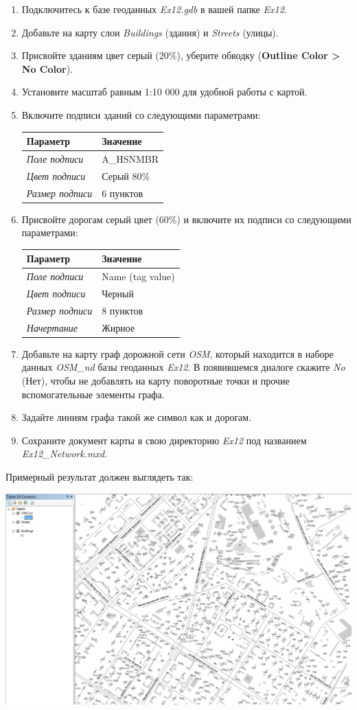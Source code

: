 \documentclass[]{book}
\theoremstyle{definition}
\theoremstyle{definition}
\theoremstyle{definition}
\theoremstyle{remark}
\begin{document}
\begin{enumerate}
\def\labelenumi{\arabic{enumi}.}
\item
  Подключитесь к базе геоданных \emph{Ex12.gdb} в вашей папке
  \emph{Ex12}.
\item
  Добавьте на карту слои \emph{Buildings} (здания) и \emph{Streets}
  (улицы).
\item
  Присвойте зданиям цвет серый (20\%), уберите обводку (\textbf{Outline
  Color \textgreater{} No Color}).
\item
  Установите масштаб равным 1:10 000 для удобной работы с картой.
\item
  Включите подписи зданий со следующими параметрами:

  \begin{longtable}[]{@{}ll@{}}
  \toprule
  Параметр & Значение\tabularnewline
  \midrule
  \endhead
  \emph{Поле подписи} & A\_HSNMBR\tabularnewline
  \emph{Цвет подписи} & Серый 80\%\tabularnewline
  \emph{Размер подписи} & 6 пунктов\tabularnewline
  \bottomrule
  \end{longtable}
\item
  Присвойте дорогам серый цвет (60\%) и включите их подписи со
  следующими параметрами:

  \begin{longtable}[]{@{}ll@{}}
  \toprule
  Параметр & Значение\tabularnewline
  \midrule
  \endhead
  \emph{Поле подписи} & Name (tag value)\tabularnewline
  \emph{Цвет подписи} & Черный\tabularnewline
  \emph{Размер подписи} & 8 пунктов\tabularnewline
  \emph{Начертание} & Жирное\tabularnewline
  \bottomrule
  \end{longtable}
\item
  Добавьте на карту граф дорожной сети \emph{OSM}, который находится в
  наборе данных \emph{OSM\_nd} базы геоданных \emph{Ex12}. В появившемся
  диалоге скажите \emph{No} (Нет), чтобы не добавлять на карту
  поворотные точки и прочие вспомогательные элементы графа.
\item
  Задайте линиям графа такой же символ как и дорогам.
\item
  Сохраните документ карты в свою директорию \emph{Ex12} под названием
  \emph{Ex12\_Network.mxd}.
\end{enumerate}

Примерный результат должен выглядеть так:

\includegraphics{images/Ex12/image6.png}
\end{document}
